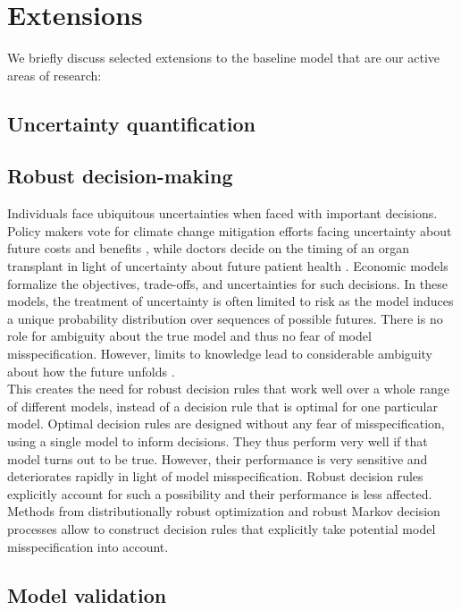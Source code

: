 \section{Extensions}\label{Extensions}
We briefly discuss selected extensions to the baseline model that are our active areas of research:

\subsection{Uncertainty quantification}

\subsection{Robust decision-making} Individuals face ubiquitous uncertainties when faced with important decisions. Policy makers vote for climate change mitigation efforts facing uncertainty about future costs and benefits \citep{Barnett.2019}, while doctors decide on the timing of an organ transplant
in light of uncertainty about future patient health \citep{Kaufman.2017}. Economic models formalize the objectives, trade-offs, and uncertainties for such decisions. In these models, the treatment of uncertainty is often limited to risk as the model induces a unique probability distribution over sequences of possible futures. There is no role for ambiguity about the true model \citep{Knight.1921,Arrow.1951} and thus no fear of model misspecification. However, limits to knowledge lead to considerable ambiguity about how the future unfolds \citep{Hayek.1975,Hansen.2015}.\\

\noindent This creates the need for robust decision rules that work well over a whole range of different models, instead of a decision rule that is optimal for one particular model. Optimal decision rules are designed without any fear of misspecification, using a single model to inform decisions. They thus perform very well if that model turns out to be true. However, their performance is very sensitive and deteriorates rapidly in light of model misspecification. Robust decision rules explicitly account for such a possibility and their performance is less affected.\\

\noindent Methods from distributionally robust optimization \citep{Ben-Tal.2009,Wiesemann.2014,Rahimian.2019} and robust Markov decision processes \citep{Iyengar.2005,Nilim.2005,Wiesemann.2014} allow to construct decision rules that explicitly take potential model misspecification into account.

\subsection{Model validation}
